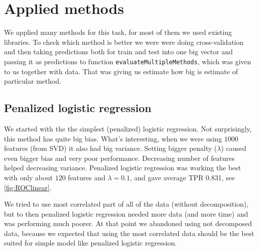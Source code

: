 \documentclass[]{article}
\begin{document}

\section{Applied methods}
We applied many methods for this task, for most of them we used existing libraries. To check which method is better we were were doing cross-validation and then taking predictions both for train and test into one big vector and passing it as predictions to function \verb+evaluateMultipleMethods+, which was given to us together with data. That was giving us estimate how big is estimate of particular method.

\subsection{Penalized logistic regression}
We started with the the simplest (penalized) logistic regression. Not surprisingly, this method has quite big bias. What's interesting, when we were using $1000$ features (from SVD) it also had big variance. Setting bigger penalty ($\lambda$) caused even bigger bias and very poor performance. Decreasing number of features helped decreasing variance. Penalized logistic regression was working the best with only about $120$ features and $\lambda = 0.1$, and gave average TPR 0.831, see \ref{fig:ROClinear}.

We tried to use most correlated part of all of the data (without decomposition), but to then penalized logistic regression needed more data (and more time) and was performing much poorer. At that point we abandoned using not decomposed data, because we expected that using the most correlated data should be the best suited for simple model like penalized logistic regression.
\end{document}
